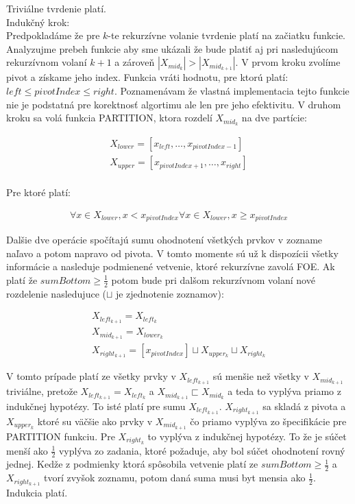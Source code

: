 \documentclass[paper=a4, fontsize=11pt]{scrartcl} %
\numberwithin{equation}{section} %
\numberwithin{figure}{section} %
\numberwithin{table}{section} %
\begin{document}
Triviálne tvrdenie platí. \\
Indukčný krok: \\
Predpokladáme že pre $k$-te rekurzívne volanie tvrdenie platí na začiatku funkcie. Analyzujme prebeh funkcie aby sme ukázali že bude platiť aj pri nasledujúcom rekurzívnom volaní $k+1$ a zároveň $|X_{mid_k}| > |X_{mid_{k+1}}|$.
V prvom kroku zvolíme pivot a získame jeho index. Funkcia vráti hodnotu, pre ktorú platí: $left \leq pivotIndex \leq right$. Poznamenávam že vlastná implementacia tejto funkcie nie je podstatná pre korektnosť algortimu ale len pre jeho efektivitu. V druhom kroku sa volá funkcia PARTITION, ktora rozdelí $X_{mid_k}$ na dve partície:

\begin{equation}
    \begin{aligned}
        X_{lower} = [x_{left}, \dots, x_{pivotIndex-1}] \\
        X_{upper} = [x_{pivotIndex+1}, \dots, x_{right}] \\
    \end{aligned}
\end{equation}

Pre ktoré platí:

\begin{equation}
    \begin{aligned}
        \forall x \in X_{lower}, x < x_{pivotIndex}
        \forall x \in X_{lower}, x \geq x_{pivotIndex}
    \end{aligned}
\end{equation}

Dalšie dve operácie spočítajú sumu ohodnotení všetkých prvkov v zozname naľavo a potom napravo od pivota. V tomto momente sú už k dispozícii všetky informácie a nasleduje podmienené vetvenie, ktoré rekurzívne zavolá FOE. Ak platí že $sumBottom \geq \frac{1}{2}$ potom bude pri dalšom rekurzívnom volaní nové rozdelenie nasledujuce ($\sqcup$ je zjednotenie zoznamov):

\begin{equation}
    \begin{aligned}
        X_{left_{k+1}} = X_{left_k} \\
        X_{mid_{k+1}} = X_{lower_k} \\
        X_{right_{k+1}} = [x_{pivotIndex}] \sqcup X_{upper_k} \sqcup X_{right_k}
    \end{aligned}
\end{equation}

V tomto prípade platí ze všetky prvky v $X_{left_{k+1}}$ sú menšie než všetky v $X_{mid_{k+1}}$ triviálne, pretože $X_{left_{k+1}} = X_{left_k}$ a $X_{mid_{k+1}} \sqsubset X_{mid_{k}}$ a teda to vyplýva priamo z indukčnej hypotézy. To isté platí pre sumu $X_{left_{k+1}}$. $X_{right_{k+1}}$ sa skladá z pivota a $X_{upper_k}$ ktoré su väčšie ako prvky v $X_{mid_{k+1}}$ čo priamo vyplýva zo špecifikácie pre PARTITION funkciu. Pre $X_{right_k}$ to vyplýva z indukčnej hypotézy. To že je súčet menší ako $\frac{1}{2}$ vyplýva zo zadania, ktoré požaduje, aby bol súčet ohodnotení rovný jednej. Kedže z podmienky ktorá spôsobila vetvenie platí ze $sumBottom \geq \frac{1}{2}$ a $X_{right_{k+1}}$ tvorí zvyšok zoznamu, potom daná suma musi byt mensia ako $\frac{1}{2}$. Indukcia platí.
\end{document}
